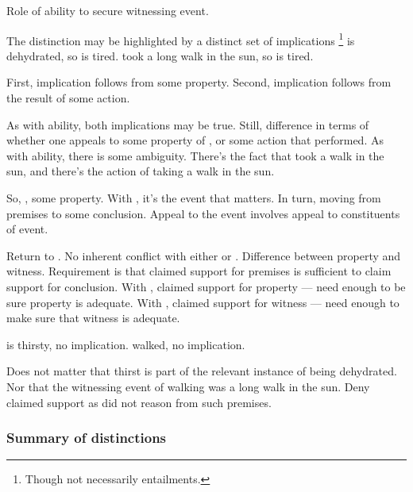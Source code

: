 \begin{note}
  Role of ability to secure witnessing event.

  The distinction may be highlighted by a distinct set of implications\nolinebreak
  \footnote{
    Though not necessarily entailments.
  }
   is dehydrated, so  is tired.
   took a long walk in the sun, so  is tired.

  First, implication follows from some property.
  Second, implication follows from the result of some action.

  As with ability, both implications may be true.
  Still, difference in terms of whether one appeals to some property of , or some action that  performed.
  As with ability, there is some ambiguity.
  There's the fact that  took a walk in the sun, and there's the action of  taking a walk in the sun.
\end{note}

\begin{note}[Why]
  So, \AR{}, some property.
  With \WR{}, it's the event that matters.
  In turn, moving from premises to some conclusion.
  Appeal to the event involves appeal to constituents of event.

  Return to \ESU{}.
  No inherent conflict with either \AR{} or \WR{}.
  Difference between property and witness.
  Requirement is that claimed support for premises is sufficient to claim support for conclusion.
  With \AR{}, claimed support for property --- need enough to be sure property is adequate.
  With \WR{}, claimed support for witness --- need enough to make sure that witness is adequate.

   is thirsty, no implication.
   walked, no implication.

  Does not matter that thirst is part of the relevant instance of being dehydrated.
  Nor that the witnessing event of walking was a long walk in the sun.
  Deny claimed support as did not reason from such premises.
\end{note}

\subsubsection{Summary of distinctions}
\label{sec:summary-distinctions}

